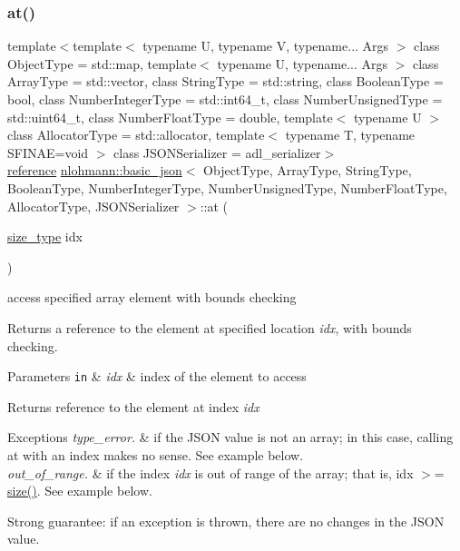 \subsubsection{\texorpdfstring{at()}{at()}\hspace{0.1cm}{\footnotesize\ttfamily [1/6]}}
{\footnotesize\ttfamily template$<$template$<$ typename U, typename V, typename... Args $>$ class Object\+Type = std\+::map, template$<$ typename U, typename... Args $>$ class Array\+Type = std\+::vector, class String\+Type  = std\+::string, class Boolean\+Type  = bool, class Number\+Integer\+Type  = std\+::int64\+\_\+t, class Number\+Unsigned\+Type  = std\+::uint64\+\_\+t, class Number\+Float\+Type  = double, template$<$ typename U $>$ class Allocator\+Type = std\+::allocator, template$<$ typename T, typename S\+F\+I\+N\+A\+E=void $>$ class J\+S\+O\+N\+Serializer = adl\+\_\+serializer$>$ \\
\mbox{\hyperlink{classnlohmann_1_1basic__json_ac6a5eddd156c776ac75ff54cfe54a5bc}{reference}} \mbox{\hyperlink{classnlohmann_1_1basic__json}{nlohmann\+::basic\+\_\+json}}$<$ Object\+Type, Array\+Type, String\+Type, Boolean\+Type, Number\+Integer\+Type, Number\+Unsigned\+Type, Number\+Float\+Type, Allocator\+Type, J\+S\+O\+N\+Serializer $>$\+::at (\begin{DoxyParamCaption}\item[{\mbox{\hyperlink{classnlohmann_1_1basic__json_a39f2cd0b58106097e0e67bf185cc519b}{size\+\_\+type}}}]{idx }\end{DoxyParamCaption})\hspace{0.3cm}{\ttfamily [inline]}}



access specified array element with bounds checking 

Returns a reference to the element at specified location {\itshape idx}, with bounds checking.


\begin{DoxyParams}[1]{Parameters}
\mbox{\tt in}  & {\em idx} & index of the element to access\\
\hline
\end{DoxyParams}
\begin{DoxyReturn}{Returns}
reference to the element at index {\itshape idx} 
\end{DoxyReturn}

\begin{DoxyExceptions}{Exceptions}
{\em type\+\_\+error.} & if the J\+S\+ON value is not an array; in this case, calling {\ttfamily at} with an index makes no sense. See example below. \\
\hline
{\em out\+\_\+of\+\_\+range.} & if the index {\itshape idx} is out of range of the array; that is, {\ttfamily idx $>$= \mbox{\hyperlink{classnlohmann_1_1basic__json_a25e27ad0c6d53c01871c5485e1f75b96}{size()}}}. See example below.\\
\hline
\end{DoxyExceptions}
Strong guarantee\+: if an exception is thrown, there are no changes in the J\+S\+ON value.

